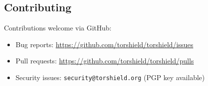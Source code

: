 \documentclass[11pt,a4paper]{article}
\begin{document}
\subsection{Contributing}

Contributions welcome via GitHub:
\begin{itemize}
\item Bug reports: \url{https://github.com/torshield/torshield/issues}
\item Pull requests: \url{https://github.com/torshield/torshield/pulls}
\item Security issues: \texttt{security@torshield.org} (PGP key available)
\end{itemize}
\end{document}
